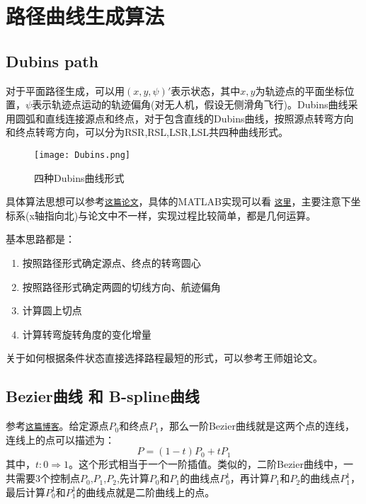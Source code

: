 \section{路径曲线生成算法}
\subsection{Dubins path}
对于平面路径生成，可以用$(x,y,\psi)'$表示状态，其中$x,y$为轨迹点的平面坐标位置，$\psi$表示轨迹点运动的轨迹偏角(对无人机，假设无侧滑角飞行)。Dubins曲线采用圆弧和直线连接源点和终点，对于包含直线的Dubins曲线，按照源点转弯方向和终点转弯方向，可以分为RSR,RSL,LSR,LSL共四种曲线形式。

\begin{figure}[htbp]
	\figskip 
	\centering
	\texttt{[image: Dubins.png]}	  
	\caption{\label{fig: Dubins} 四种Dubins曲线形式}
\end{figure}

具体算法思想可以参考\href{/attachment/Dubins.pdf}{\texttt{这篇论文}}，具体的MATLAB实现可以看
\href{/attachment/dubins.m}{\texttt{这里}}，主要注意下坐标系(x轴指向北)与论文中不一样，实现过程比较简单，都是几何运算。

基本思路都是：
\begin{enumerate}
	\item 按照路径形式确定源点、终点的转弯圆心
	\item 按照路径形式确定两圆的切线方向、航迹偏角
	\item 计算圆上切点
	\item 计算转弯旋转角度的变化增量
\end{enumerate}

关于如何根据条件状态直接选择路程最短的形式，可以参考王师姐论文。

\subsection{Bezier曲线 和 B-spline曲线}

参考\href{https://www.cnblogs.com/hnfxs/p/3148483.html}{\texttt{这篇博客}}。给定源点$P_0$和终点$P_1$，那么一阶Bezier曲线就是这两个点的连线，连线上的点可以描述为：
\begin{equation*}
    P = (1-t)P_0 + tP_1
\end{equation*}
其中，$t: 0 \Rightarrow 1$。这个形式相当于一个一阶插值。类似的，二阶Bezier曲线中，一共需要3个控制点$P_0$,$P_1$,$P_2$,先计算$P_0$和$P_1$的曲线点$P_0^1$，再计算$P_1$和$P_2$的曲线点$P_1^1$，最后计算$P_0^1$和$P_1^1$的曲线点就是二阶曲线上的点。

